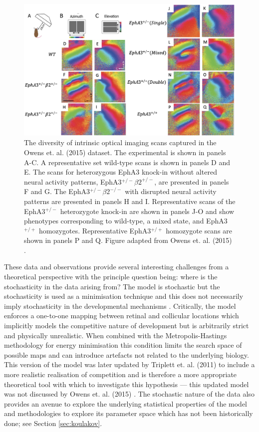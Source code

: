 \begin{figure}[h!]
	\centering
	\includegraphics[width=\textwidth]{images/lattice/owenscomp}
	\def\c{The diversity of intrinsic optical imaging scans captured in the Owens et. al. (2015) dataset. }
	\caption[\c]{\c The experimental is shown in panels A-C. A representative set wild-type scans is shown in panels D and E. The scans for heterozygous EphA3 knock-in without altered neural activity patterns, EphA3$^{+/-}$$\beta2^{+/-}$, are presented in panels F and G. The EphA3$^{+/-}$$\beta2^{-/-}$ with disrupted neural activity patterns are presented in panels H and I. Representative scans of the  EphA3$^{+/-}$ heterozygote knock-in are shown in panels J-O and show phenotypes corresponding to wild-type, a mixed state, and EphA3$^{+/+}$ homozygotes. Representative EphA3$^{+/+}$ homozygote scans are shown in panels P and Q. Figure adapted from Owens et. al. (2015) \cite{Owens2015-zv}. \label{fig:owens}}
\end{figure}

\FloatBarrier
These data and observations provide several interesting challenges from a theoretical perspective with the principle question being: where is the stochasticity in the data arising from? The model is stochastic but the stochasticity is used as a minimisation technique and this does not necessarily imply stochasticity in the developmental mechanisms \cite{Tsigankov2006-uy}. Critically, the model enforces a one-to-one mapping between retinal and collicular locations which implicitly models the competitive nature of development but is arbitrarily strict and physically unrealistic. When combined with the Metropolis-Hastings methodology for energy minimisation this condition limits the search space of possible maps and can introduce artefacts not related to the underlying biology. This version of the model was later updated by Triplett et. al. (2011) to include a more realistic realisation of competition and is therefore a more appropriate theoretical tool with which to investigate this hypothesis --- this updated model was not discussed by Owens et. al. (2015) \cite{Triplett2011-jk, Owens2015-zv}. The stochastic nature of the data also provides an avenue to explore the underlying statistical properties of the model and methodologies to explore its parameter space which has not been historically done; see Section \ref{sec:koulakov}. 

